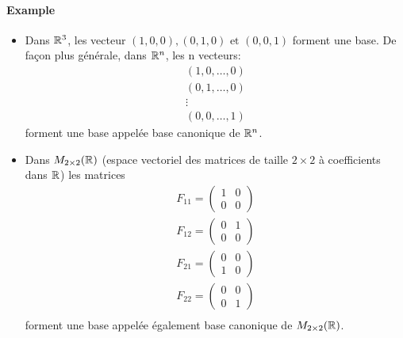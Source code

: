 \paragraph{Example}
\begin{itemize}
  \item Dans $\mathbb{R}^3$, les vecteur $(1, 0, 0), (0, 1, 0) \text{ et } (0, 0, 1)$ forment une base.  De façon plus générale, dans $\mathbb{R}^n$, les n vecteurs:
    \begin{eqnarray*}
      (1, 0, \ldots, 0) \\
      (0, 1, \ldots, 0) \\
      \vdots \\
      (0, 0, \ldots, 1) 
    \end{eqnarray*}
    forment une base appelée base canonique de $\mathbb{R}^n$.
  \item Dans $M_{2\times 2}(\mathbb{R})$ (espace vectoriel des matrices de taille $2\times 2$ à coefficients dans $\mathbb{R}$) les matrices 
    \begin{eqnarray*}
      F_{11} = \begin{pmatrix} 1 & 0 \\ 0 & 0 \end{pmatrix} \\
      F_{12} = \begin{pmatrix} 0 & 1 \\ 0 & 0 \end{pmatrix} \\
      F_{21} = \begin{pmatrix} 0 & 0 \\ 1 & 0 \end{pmatrix} \\
      F_{22} = \begin{pmatrix} 0 & 0 \\ 0 & 1 \end{pmatrix} \\
    \end{eqnarray*}
    forment une base appelée également base canonique de $M_{2 \times 2}(\mathbb{R})$.
\end{itemize}


